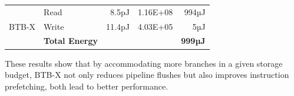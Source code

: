 \begin{small}
\begin{table}
\begin{tabular}{llrrr}
            \multirow{3}{*}{BTB-X} & \multicolumn{1}{l}{Read} & \multicolumn{1}{r}{8.5pJ} & \multicolumn{1}{r}{1.16E+08} & \multicolumn{1}{r}{994µJ}\\\cline{2-5}
                                 & \multicolumn{1}{l}{Write} & \multicolumn{1}{r}{11.4pJ} & \multicolumn{1}{r}{4.03E+05} & \multicolumn{1}{r}{5µJ}\\\cline{2-5}
                                 & \multicolumn{1}{l}{\textbf{Total Energy}} & \multicolumn{1}{r}{} & \multicolumn{1}{r}{} & \multicolumn{1}{r}{\textbf{999µJ}}\\\hline

        \end{tabular}
\end{table}
\end{small}


These results show that by accommodating more branches in a given storage budget, BTB-X not only reduces pipeline flushes but also improves instruction prefetching, both lead to better performance.

